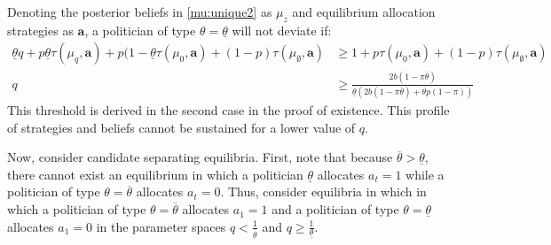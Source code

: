 \documentclass[11pt,english]{article}
\begin{document}
\begin{itemize}
Denoting the posterior beliefs in \eqref{mu:unique2} as $\mu_z$ and equilibrium allocation strategies as $\boldsymbol{a}$, a politician of type $\theta = \underline{\theta}$ will not deviate if:
\begin{align*}
\underline{\theta}q + p \underline{\theta}\tau(\mu_q, \boldsymbol{a})+ p(1-\underline{\theta}\tau(\mu_0, \boldsymbol{a}) + (1-p)\tau(\mu_\emptyset, \boldsymbol{a}) &\geq 1 + p\tau(\mu_0, \boldsymbol{a})+(1-p)\tau(\mu_\emptyset, \boldsymbol{a})\\
q &\geq \frac{2b (1 - \pi \overline{\theta})}{\underline{\theta}(2b(1-\pi \overline{\theta})+\overline{\theta}p(1-\pi))}
\end{align*}
This threshold is derived in the second case in the proof of existence. This profile of strategies and beliefs cannot be sustained for a lower value of $q$.
\end{itemize}
Now, consider candidate separating equilibria. First, note that because $\overline{\theta} > \underline{\theta}$, there cannot exist an equilibrium in which a politician $\underline{\theta}$ allocates $a_t = 1$ while a politician of type $\theta = \overline{\theta}$  allocates $a_t = 0$. Thus, consider equilibria in which in which a politician of type $\theta = \overline{\theta}$ allocates $a_1 = 1$ and a politician of type $\theta = \underline{\theta}$ allocates $a_1 = 0$ in the parameter spaces $q <\frac{1}{\overline{\theta}}$ and $q \geq \frac{1}{\underline{\theta}}$. 
\end{document}
